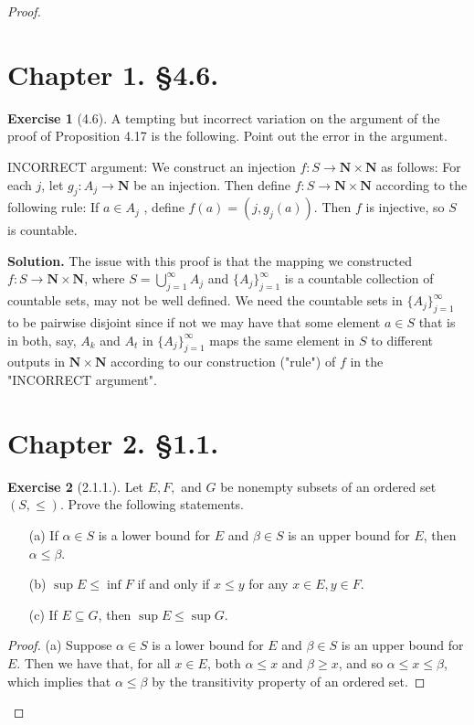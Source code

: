 \documentclass[9pt,reqno]{amsart}
\theoremstyle{definition}
\newtheorem{exercise}{Exercise}[section]
\newcommand{\nn}{\mathbf N}
\begin{document}
\begin{proof}
	\section*{Chapter 1. \S 4.6.}
\begin{exercise}[4.6]  A tempting but incorrect variation on the argument of the proof of Proposition 4.17 is the following. Point out the error in the argument. 
\begin{center}
	\parbox{4in}{INCORRECT argument: We construct an injection $f \colon S \to  \nn \times \nn$ as follows: For each $j$, let $g_j \colon A_j → \nn$ be an injection. Then define $f \colon S \to  \nn \times \nn$ according to the following rule: If $a \in A_j$ , define $f (a) = (j, g_j (a))$. Then $f$ is injective, so $S$ is countable.
	}
\end{center}
\end{exercise} 
\textbf{Solution.} The issue with this proof is that the mapping we constructed $f \colon S \to \nn \times \nn$, where $S = \bigcup _{j = 1}^\infty A_j$ and $\{A_j \}_{j = 1}^\infty$ is a countable collection of countable sets, may not be well defined. We need the countable sets in $\{A_j \}_{j =1}^\infty$ to be pairwise disjoint since if not we may have that some element $a \in S$ that is in both, say, $A_k$ and $A_t$ in $\{A_j \}_{j =1}^\infty$ maps the same element in $S$ to different outputs in $\nn \times \nn$  according to our construction ("rule") of $f$ in the "INCORRECT argument". 


\section*{Chapter 2. \S 1.1.}
\begin{exercise}[2.1.1.]
Let $E, F,$ and $G$ be nonempty subsets of an ordered set $(S, \leq )$. Prove the following statements.
\begin{itemize}
	\item [(a)] If $\alpha \in S$ is a lower bound for $E$ and $\beta \in S$ is an upper bound for $E$, then $\alpha \leq \beta$.
	\item [(b)] $\sup E \leq \inf F$ if and only if $x \leq y$ for any $x \in E, y \in F$.
	\item [(c)] If $E \subseteq G$, then $\sup E \leq \sup G$.
\end{itemize}
\end{exercise}
\begin{proof}
	(a) Suppose $\alpha \in S$ is a lower bound for $E$ and $\beta \in S$ is an upper bound for $E$. Then we have that, for all $x \in E$, both $\alpha \leq x$ and $\beta \geq x$, and so $\alpha \leq x \leq \beta $, which implies that $\alpha \leq \beta$ by the transitivity property of an ordered set. 
	

\end{proof}
\end{proof}
\end{document}
